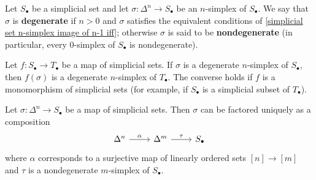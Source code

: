 Let $S_\bullet$ be a simplicial set and let $\sigma:\Delta^n\to S_\bullet$ be an $n$-simplex of $S_\bullet$. We say that $\sigma$ is \textbf{degenerate} if $n>0$ and $\sigma$ satisfies the equivalent conditions of \cref{simplicial set n-simplex image of n-1 iff}; otherwise $\sigma$ is said to be \textbf{nondegenerate} (in particular, every $0$-simplex of $S_\bullet$ is nondegenerate).
\begin{example}
Let $f:S_\bullet\to T_\bullet$ be a map of simplicial sets. If $\sigma$ is a degenerate $n$-simplex of $S_\bullet$, then $f(\sigma)$ is a degenerate $n$-simplex of $T_\bullet$. The converse holds if $f$ is a monomorphism of simplicial sets (for example, if $S_\bullet$ is a simplicial subset of $T_\bullet$).
\end{example}
\begin{proposition}\label{simplicial set map from Delta^n factorization}
Let $\sigma:\Delta^n\to S_\bullet$ be a map of simplicial sets. Then $\sigma$ can be factored uniquely as a composition
\[\begin{tikzcd}
\Delta^n\ar[r,"\alpha"]&\Delta^m\ar[r,"\tau"]&S_\bullet
\end{tikzcd}\]
where $\alpha$ corresponds to a surjective map of linearly ordered sets $[n]\to[m]$ and $\tau$ is a nondegenerate $m$-simplex of $S_\bullet$.
\end{proposition}
